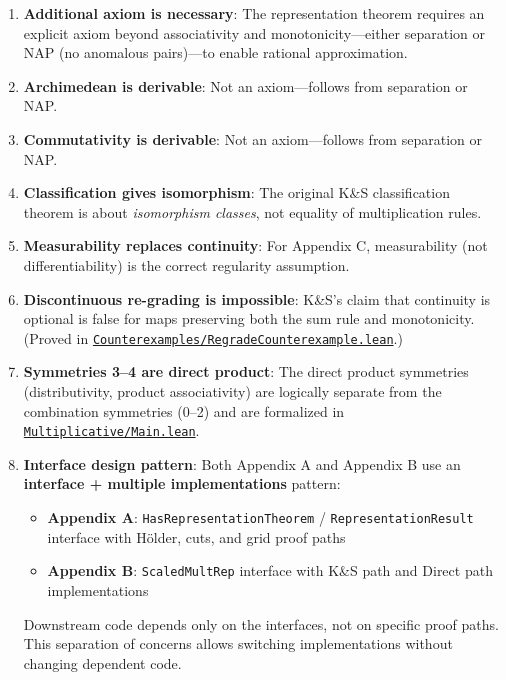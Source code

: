 \documentclass[11pt]{article}
\theoremstyle{definition}
\theoremstyle{remark}
\begin{document}
\begin{enumerate}
\textbf{Status}: K\&S claim \textbf{corrected}. Identity with \texttt{ident\_le} is
\textbf{essential} for positivity, not merely ``aesthetic.''

\item \textbf{Additional axiom is necessary}: The representation theorem requires an explicit axiom beyond associativity and monotonicity---either separation or NAP (no anomalous pairs)---to enable rational approximation.

\item \textbf{Archimedean is derivable}: Not an axiom---follows from separation or NAP.

\item \textbf{Commutativity is derivable}: Not an axiom---follows from separation or NAP.

\item \textbf{Classification gives isomorphism}: The original K\&S classification theorem is about \emph{isomorphism classes}, not equality of multiplication rules.

\item \textbf{Measurability replaces continuity}: For Appendix C, measurability (not differentiability) is the correct regularity assumption.

\item \textbf{Discontinuous re-grading is impossible}: K\&S's claim that continuity is optional is false
for maps preserving both the sum rule and monotonicity.
\\
(Proved in \href{https://github.com/zariuq/ks-foundations-of-inference/blob/main/KnuthSkilling/Counterexamples/RegradeCounterexample.lean}{\texttt{Counterexamples/RegradeCounterexample.lean}}.)

\item \textbf{Symmetries 3--4 are direct product}: The direct product symmetries (distributivity, product associativity) are logically separate from the combination symmetries (0--2) and are formalized in \href{https://github.com/zariuq/ks-foundations-of-inference/blob/main/KnuthSkilling/Multiplicative/Main.lean}{\texttt{Multiplicative/Main.lean}}.

\item \textbf{Interface design pattern}: Both Appendix A and Appendix B use an \textbf{interface + multiple implementations} pattern:
\begin{itemize}
\item \textbf{Appendix A}: \texttt{HasRepresentationTheorem} / \texttt{RepresentationResult} interface with Hölder, cuts, and grid proof paths
\item \textbf{Appendix B}: \texttt{ScaledMultRep} interface with K\&S path and Direct path implementations
\end{itemize}
Downstream code depends only on the interfaces, not on specific proof paths. This separation of concerns
allows switching implementations without changing dependent code.
\end{enumerate}
\end{document}
